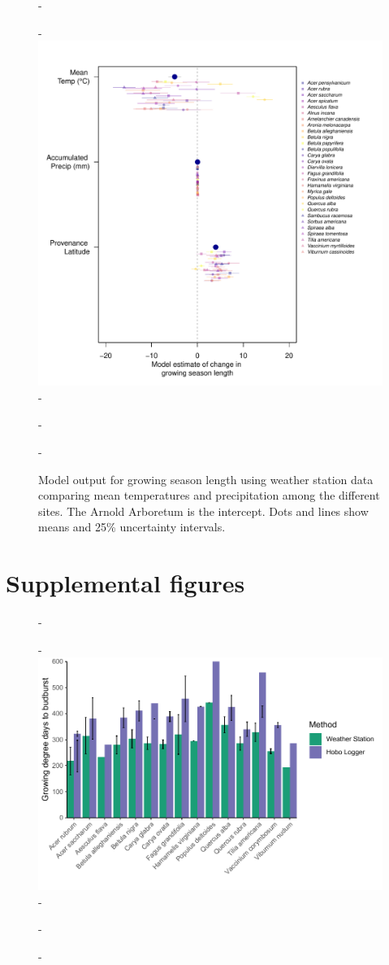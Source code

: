 \documentclass{article}\usepackage[]{graphicx}\usepackage[]{color}
\begin{document}
{{\begin{figure} [H]
  -\begin{center}
  -\includegraphics[width=12cm]{..//analyses/figures/muplot_gsclim.pdf}
  -\caption{Model output for growing season length using weather station data comparing mean temperatures and precipitation among the different sites. The Arnold Arboretum is the intercept. Dots and lines show means and 25\% uncertainty intervals.}\label{fig:gsclim}
  -\end{center}
  -\end{figure}}

\section*{Supplemental figures}

{\begin{figure} [H]
  -\begin{center}
  -\includegraphics[width=12cm]{..//analyses/figures/stationvshobo_ts2019.pdf}
  -\caption{}\label{fig:barcompare}
  -\end{center}
  -\end{figure}}
  
}
\end{document}
